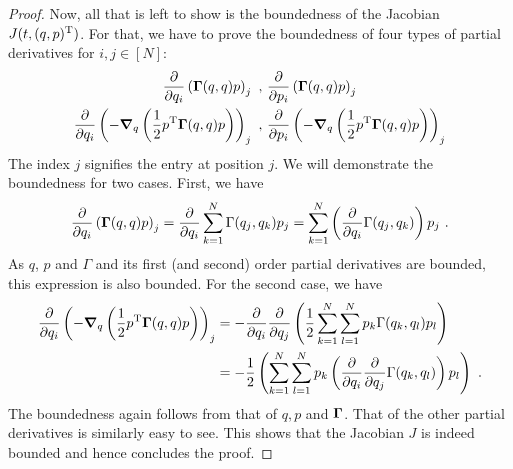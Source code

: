 \begin{proof}
	Now, all that is left to show is the boundedness of the Jacobian $J(t, (q, p)^{\mathrm{T}})$.
	For that, we have to prove the boundedness of four types of partial derivatives for $i, j \in [N]$:
	\begin{align}
		\frac{\partial}{\partial q_{i}} \left(\bGamma(q, q) p\right)_j \ ,\
		&\frac{\partial}{\partial p_{i}} \left(\bGamma(q, q) p\right)_j \\
		\frac{\partial}{\partial q_{i}} \left(-\grad_q \left(\frac{1}{2} p^\mathrm{T} \bGamma(q, q) p\right)\right)_j \ ,\
		&\frac{\partial}{\partial p_{i}} \left(-\grad_q \left(\frac{1}{2} p^\mathrm{T} \bGamma(q, q) p\right)\right)_j\\
	\end{align}
	The index $j$ signifies the entry at position $j$.
	We will demonstrate the boundedness for two cases.
	First, we have
	\begin{equation}
		\frac{\partial}{\partial q_{i}} \left(\mathbf{\Gamma}(q, q) p\right)_j
		= \frac{\partial}{\partial q_{i}} \sum_{k=1}^N \Gamma(q_j, q_k) p_j
		=  \sum_{k=1}^N \left(\frac{\partial}{\partial q_{i}} \Gamma(q_j, q_k)\right) p_j \ .
	\end{equation}
	As $q$, $p$ and $\Gamma$ and its first (and second) order partial derivatives are bounded, this expression is also bounded.
	For the second case, we have
	\begin{align}
		\frac{\partial}{\partial q_{i}} \left(-\grad_q \left(\frac{1}{2} p^\mathrm{T} \bGamma(q, q) p\right)\right)_j
		&= - \frac{\partial}{\partial q_i} \frac{\partial}{\partial q_j} \left(\frac{1}{2}
		\sum_{k=1}^N\sum_{l=1}^{N} p_k \Gamma(q_k, q_l) p_l\right)\\
		&= -\frac{1}{2} \left(
		\sum_{k=1}^N\sum_{l=1}^{N} p_k \left(\frac{\partial}{\partial q_i} \frac{\partial}{\partial q_j} \Gamma(q_k, q_l)\right) p_l\right) \ .
	\end{align}
	The boundedness again follows from that of $q, p$ and $\mathbf{\Gamma}$.
	That of the other partial derivatives is similarly easy to see.
	This shows that the Jacobian $J$ is indeed bounded and hence concludes the proof.
	

\end{proof}
